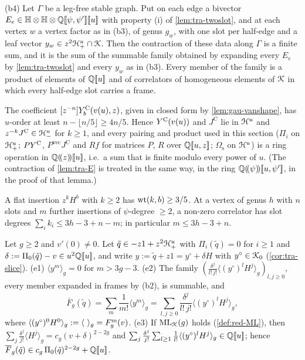 \begin{lem}
\begin{description}
(b4) Let $\Gamma$ be a leg-free stable graph. Put on each edge a bivector $E_e\in\mathbb{H}\otimes\mathbb{H}\otimes\mathbb{Q}[\![ \psi,\psi' ]\!][\![ u ]\!]$ with property (i) of \cref{lem:tra-twoslot}, and at each vertex $w$ a vertex factor as in (b3), of genus $g_w$, with one slot per half-edge and a leaf vector $y_w\in z^2\mathcal{H}^u_+\cap\mathcal{K}$. Then the contraction of these data along $\Gamma$ is a finite sum, and it is the sum of the summable family obtained by expanding every $E_e$ by \cref{lem:tra-twoslot} and every $y_w$ as in (b3). Every member of the family is a product of elements of $\mathbb{Q}[\![ u ]\!]$ and of correlators of homogeneous elements of $\mathcal{K}$ in which every half-edge slot carries a frame.
\item[(c) Vanishing series; pairings] The coefficient $[z^{-n}]Y^{\mathrm{C}}_b(v(u),z)$, given in closed form by \cref{lem:gau-vanshape}, has $u$-order at least $n-\lfloor n/5\rfloor\geq 4n/5$. Hence $Y^{\mathrm{C}}(v(u))$ and $J^{\mathrm C}$ lie in $\mathcal{H}^u$ and $z^{-k}J^{\mathrm C}\in\mathcal{H}^u_-$ for $k\geq 1$, and every pairing and product used in this section ($\Pi_i$ on $\mathcal{H}^u_+$; $PY^{\mathrm{C}}$, $P^{\mathrm{vec}}J^{\mathrm C}$ and $Rf$ for matrices $P$, $R$ over $\mathbb{Q}[\![ u,z ]\!]$; $\Omega_{\mathrm s}$ on $\mathcal{H}^u$) is a ring operation in $\mathbb{Q}(\!(z)\!)[\![ u ]\!]$, i.e.\ a sum that is finite modulo every power of $u$. (The contraction of \cref{lem:tra-E} is treated in the same way, in the ring $\mathbb{Q}(\!(\psi)\!)[\![ u,\psi' ]\!]$, in the proof of that lemma.)
\item[(d) Leaves] A flat insertion $z^kH^b$ with $k\geq 2$ has $\operatorname{wt}(k,b)\geq 3/5$. At a vertex of genus $h$ with $n$ slots and $m$ further insertions of $\psi$-degree $\geq 2$, a non-zero correlator has slot degrees $\sum_ik_i\leq 3h-3+n-m$; in particular $m\leq 3h-3+n$.
\item[(e) Vertex resummation] Let $g\geq 2$ and $v'(0)\neq 0$. Let $\tilde q\in -z1+z^2\mathcal{H}^u_+$ with $\Pi_i(\tilde q) = 0$ for $i\geq 1$ and $\delta := \Pi_0(\tilde q)-v\in u^2\mathbb{Q}[\![ u ]\!]$, and write $y := \tilde q+z1 = y^\circ+\delta H$ with $y^\circ\in\mathcal{K}_{0}$ (\cref{cor:tra-slice}). (e1) $\langle y^m\rangle_g = 0$ for $m>3g-3$. (e2) The family $(\frac{\delta^j}{l!\,j!}\langle(y^\circ)^lH^j\rangle_g)_{l,j\geq 0}$, every member expanded in frames by (b2), is summable, and
\[
\overline F_g(\tilde q) = \sum_m\frac1{m!}\langle y^m\rangle_g = \sum_{l,j\geq 0}\frac{\delta^j}{l!\,j!}\langle(y^\circ)^lH^j\rangle_g,
\]
where $\langle(y^\circ)^0H^0\rangle_g := \langle\ \rangle_g = F^{\mathrm{m}}_g(v)$. (e3) If $\mathrm{ML}_{\mathcal{K}}(g)$ holds (\cref{def:red-ML}), then $\sum_j\frac{\delta^j}{j!}\langle H^j\rangle_g = c_g(v+\delta)^{2-2g}$ and $\sum_j\frac{\delta^j}{j!}\sum_{l\geq 1}\frac1{l!}\langle(y^\circ)^lH^j\rangle_g\in\mathbb{Q}[\![ u ]\!]$; hence $\overline F_g(\tilde q)\in c_g\,\Pi_0(\tilde q)^{2-2g}+\mathbb{Q}[\![ u ]\!]$.

\end{description}
\end{lem}
